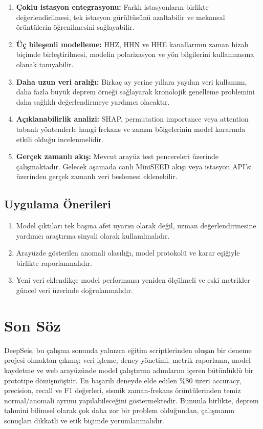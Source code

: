 \begin{enumerate}
    \item \textbf{Çoklu istasyon entegrasyonu:} Farklı istasyonların birlikte değerlendirilmesi, tek istasyon gürültüsünü azaltabilir ve mekansal örüntülerin öğrenilmesini sağlayabilir.
    
    \item \textbf{Üç bileşenli modelleme:} HHZ, HHN ve HHE kanallarının zaman hizalı biçimde birleştirilmesi, modelin polarizasyon ve yön bilgilerini kullanmasına olanak tanıyabilir.
    
    \item \textbf{Daha uzun veri aralığı:} Birkaç ay yerine yıllara yayılan veri kullanımı, daha fazla büyük deprem örneği sağlayarak kronolojik genelleme problemini daha sağlıklı değerlendirmeye yardımcı olacaktır.
    
    \item \textbf{Açıklanabilirlik analizi:} SHAP, permutation importance veya attention tabanlı yöntemlerle hangi frekans ve zaman bölgelerinin model kararında etkili olduğu incelenmelidir.
    
    \item \textbf{Gerçek zamanlı akış:} Mevcut arayüz test pencereleri üzerinde çalışmaktadır. Gelecek aşamada canlı MiniSEED akışı veya istasyon API'si üzerinden gerçek zamanlı veri beslemesi eklenebilir.
\end{enumerate}

\subsection{Uygulama Önerileri}

\begin{enumerate}
    \item Model çıktıları tek başına afet uyarısı olarak değil, uzman değerlendirmesine yardımcı araştırma sinyali olarak kullanılmalıdır.
    \item Arayüzde gösterilen anomali olasılığı, model protokolü ve karar eşiğiyle birlikte raporlanmalıdır.
    \item Yeni veri eklendikçe model performansı yeniden ölçülmeli ve eski metrikler güncel veri üzerinde doğrulanmalıdır.
\end{enumerate}

\section{Son Söz}

DeepSeis, bu çalışma sonunda yalnızca eğitim scriptlerinden oluşan bir deneme projesi olmaktan çıkmış; veri işleme, deney yönetimi, metrik raporlama, model kaydetme ve web arayüzünde model çalıştırma adımlarını içeren bütünlüklü bir prototipe dönüşmüştür. En başarılı deneyde elde edilen \%80 üzeri accuracy, precision, recall ve F1 değerleri, sismik zaman-frekans örüntülerinden temiz normal/anomali ayrımı yapılabileceğini göstermektedir. Bununla birlikte, deprem tahmini bilimsel olarak çok daha zor bir problem olduğundan, çalışmanın sonuçları dikkatli ve etik biçimde yorumlanmalıdır.
